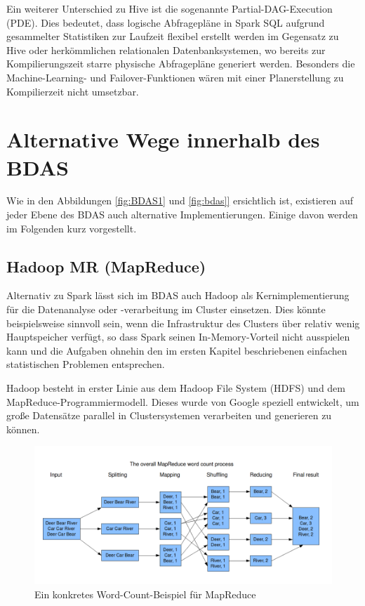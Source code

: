 Ein weiterer Unterschied zu Hive ist die sogenannte Partial-DAG-Execution (PDE). Dies bedeutet, dass logische Abfragepläne in Spark SQL aufgrund gesammelter Statistiken zur Laufzeit flexibel erstellt werden im Gegensatz zu Hive oder herkömmlichen relationalen Datenbanksystemen, wo bereits zur Kompilierungszeit starre physische Abfragepläne generiert werden. Besonders die Machine-Learning- und Failover-Funktionen wären mit einer Planerstellung zu Kompilierzeit nicht umsetzbar. 


\section{Alternative Wege innerhalb des BDAS}
\label{section:alternative Wege innerhalb des BDAS}


Wie in den Abbildungen \ref{fig:BDAS1} und \ref{fig:bdas]} ersichtlich ist, existieren auf jeder Ebene des BDAS auch alternative Implementierungen. Einige davon werden im Folgenden kurz vorgestellt. 


\subsection{Hadoop MR (MapReduce)}
\label{section:hadoop MR (MapReduce)}


Alternativ zu Spark lässt sich im BDAS auch Hadoop als Kernimplementierung für die Datenanalyse oder -verarbeitung im Cluster einsetzen. Dies könnte beispielsweise sinnvoll sein, wenn die Infrastruktur des Clusters über relativ wenig Hauptspeicher verfügt, so dass Spark seinen In-Memory-Vorteil nicht ausspielen kann und die Aufgaben ohnehin den im ersten Kapitel beschriebenen einfachen statistischen Problemen entsprechen. 
 
Hadoop besteht in erster Linie aus dem Hadoop File System (HDFS) und dem MapReduce-Programmiermodell. Dieses wurde von Google speziell entwickelt, um große Datensätze parallel in Clustersystemen verarbeiten und generieren zu können. 

\begin{figure}[htb!]
\centering
\includegraphics[width=1.0\textwidth]{bilder/2_6_1_wordcount.png}
\caption{Ein konkretes Word-Count-Beispiel für MapReduce  \protect{}}
\label{fig:wordcount}
\end{figure}   
 


